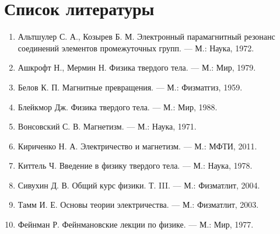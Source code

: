 \documentclass[a4paper,14pt]{extarticle}
\begin{document}
\section*{Список литературы}

\begin{enumerate}
\item Альтшулер С. А., Козырев Б. М. Электронный парамагнитный резонанс соединений элементов промежуточных групп. — М.: Наука, 1972.
\item Ашкрофт Н., Мермин Н. Физика твердого тела. — М.: Мир, 1979.
\item Белов К. П. Магнитные превращения. — М.: Физматгиз, 1959.
\item Блейкмор Дж. Физика твердого тела. — М.: Мир, 1988.
\item Вонсовский С. В. Магнетизм. — М.: Наука, 1971.
\item Кириченко Н. А. Электричество и магнетизм. — М.: МФТИ, 2011.
\item Киттель Ч. Введение в физику твердого тела. — М.: Наука, 1978.
\item Сивухин Д. В. Общий курс физики. Т. III. — М.: Физматлит, 2004.
\item Тамм И. Е. Основы теории электричества. — М.: Физматлит, 2003.
\item Фейнман Р. Фейнмановские лекции по физике. — М.: Мир, 1977.
\end{enumerate}
\end{document}
